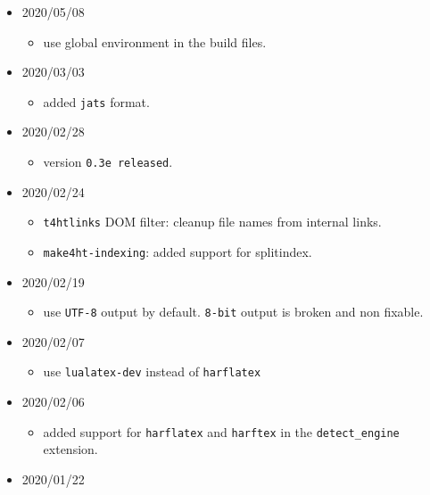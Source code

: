 \begin{itemize}
  \begin{itemize}
  \tightlist
  \item
    fixed HTML filename matching in extensions.
  \end{itemize}
\item
  2020/05/08

  \begin{itemize}
  \tightlist
  \item
    use global environment in the build files.
  \end{itemize}
\item
  2020/03/03

  \begin{itemize}
  \tightlist
  \item
    added \texttt{jats} format.
  \end{itemize}
\item
  2020/02/28

  \begin{itemize}
  \tightlist
  \item
    version \texttt{0.3e\ released}.
  \end{itemize}
\item
  2020/02/24

  \begin{itemize}
  \tightlist
  \item
    \texttt{t4htlinks} DOM filter: cleanup file names from internal
    links.
  \item
    \texttt{make4ht-indexing}: added support for splitindex.
  \end{itemize}
\item
  2020/02/19

  \begin{itemize}
  \tightlist
  \item
    use \texttt{UTF-8} output by default. \texttt{8-bit} output is
    broken and non fixable.
  \end{itemize}
\item
  2020/02/07

  \begin{itemize}
  \tightlist
  \item
    use \texttt{lualatex-dev} instead of \texttt{harflatex}
  \end{itemize}
\item
  2020/02/06

  \begin{itemize}
  \tightlist
  \item
    added support for \texttt{harflatex} and \texttt{harftex} in the
    \texttt{detect\_engine} extension.
  \end{itemize}
\item
  2020/01/22


\end{itemize}
